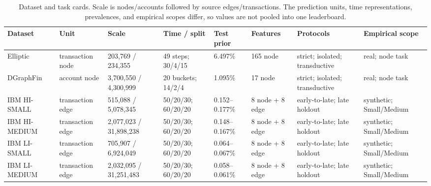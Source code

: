 \begin{table}[t]
\caption{Dataset and task cards. Scale is nodes/accounts followed by source edges/transactions. The prediction units, time representations, prevalences, and empirical scopes differ, so values are not pooled into one leaderboard.}
\label{tab:datasets}
\centering
\footnotesize
\setlength{\tabcolsep}{2.8pt}
\begin{tabularx}{\textwidth}{@{}p{}p{}p{}p{}p{}p{}p{}X@{}}
\toprule
Dataset & Unit & Scale & Time / split & Test prior & Features & Protocols & Empirical scope \\
\midrule
Elliptic & transaction node & 203,769 / 234,355 & 49 steps; 30/4/15 & 6.497\% & 165 node & strict; isolated; transductive & real; node task \\
DGraphFin & account node & 3,700,550 / 4,300,999 & 20 buckets; 14/2/4 & 1.095\% & 17 node & strict; isolated; transductive & real; node task \\
IBM HI-SMALL & transaction edge & 515,088 / 5,078,345 & 50/20/30; 60/20/20 & 0.152--0.177\% & 8 node + 8 edge & early-to-late; late holdout & synthetic; Small/Medium \\
IBM HI-MEDIUM & transaction edge & 2,077,023 / 31,898,238 & 50/20/30; 60/20/20 & 0.148--0.167\% & 8 node + 8 edge & early-to-late; late holdout & synthetic; Small/Medium \\
IBM LI-SMALL & transaction edge & 705,907 / 6,924,049 & 50/20/30; 60/20/20 & 0.064--0.067\% & 8 node + 8 edge & early-to-late; late holdout & synthetic; Small/Medium \\
IBM LI-MEDIUM & transaction edge & 2,032,095 / 31,251,483 & 50/20/30; 60/20/20 & 0.058--0.061\% & 8 node + 8 edge & early-to-late; late holdout & synthetic; Small/Medium \\
\bottomrule
\end{tabularx}
\end{table}
